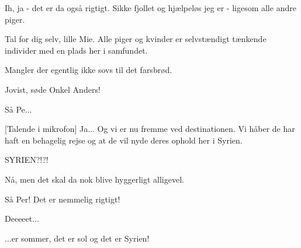 \documentclass[a4paper,11pt]{article}
\begin{document}
\begin{sketch}
 Ih, ja - det er da også rigtigt. Sikke fjollet og hjælpeløs jeg er - ligesom alle andre piger.


 Tal for dig selv, lille Mie. Alle piger og kvinder er selvstændigt tænkende individer med en plads her i samfundet.

 Mangler der egentlig ikke sovs til det farsbrød.

 Jovist, søde Onkel Anders!





 Så Pe... 

[Talende i mikrofon] Ja... Og vi er nu fremme ved destinationen. Vi håber de har haft en behagelig rejse og at de vil nyde deres ophold her i Syrien.

 SYRIEN?!?!

 Nå, men det skal da nok blive hyggerligt alligevel.

 Så Per! Det er nemmelig rigtigt!


 Deeeeet...

 ...er sommer, det er sol og det er Syrien!



\end{sketch}
\end{document}
